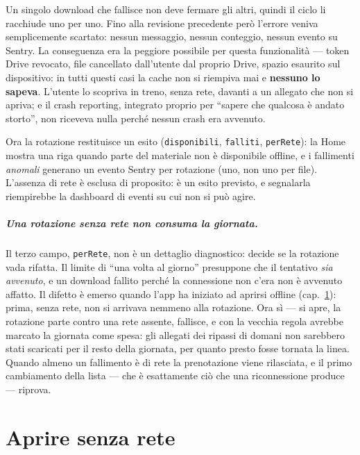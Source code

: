 \documentclass[11pt,a4paper]{report}
\begin{document}
Un singolo download che fallisce non deve fermare gli altri, quindi il ciclo
li racchiude uno per uno. Fino alla revisione precedente per\`o l'errore
veniva semplicemente scartato: nessun messaggio, nessun conteggio, nessun
evento su Sentry. La conseguenza era la peggiore possibile per questa
funzionalit\`a --- token Drive revocato, file cancellato dall'utente dal
proprio Drive, spazio esaurito sul dispositivo: in tutti questi casi la cache
non si riempiva mai e \textbf{nessuno lo sapeva}. L'utente lo scopriva in
treno, senza rete, davanti a un allegato che non si apriva; e il crash
reporting, integrato proprio per ``sapere che qualcosa \`e andato storto'',
non riceveva nulla perch\'e nessun crash era avvenuto.

Ora la rotazione restituisce un esito (\texttt{disponibili}, \texttt{falliti},
\texttt{perRete}): la Home mostra una riga quando parte del materiale non \`e
disponibile offline, e i fallimenti \emph{anomali} generano un evento Sentry
per rotazione (uno, non uno per file). L'assenza di rete \`e esclusa di
proposito: \`e un esito previsto, e segnalarla riempirebbe la dashboard di
eventi su cui non si pu\`o agire.

\paragraph{Una rotazione senza rete non consuma la giornata.} Il terzo campo,
\texttt{perRete}, non \`e un dettaglio diagnostico: decide se la rotazione vada
rifatta. Il limite di ``una volta al giorno'' presuppone che il tentativo
\emph{sia avvenuto}, e un download fallito perch\'e la connessione non c'era non
\`e avvenuto affatto. Il difetto \`e emerso quando l'app ha iniziato ad aprirsi
offline (cap.~\ref{sec:offline}): prima, senza rete, non si arrivava nemmeno
alla rotazione. Ora s\`i --- si apre, la rotazione parte contro una rete
assente, fallisce, e con la vecchia regola avrebbe marcato la giornata come
spesa: gli allegati dei ripassi di domani non sarebbero stati scaricati per il
resto della giornata, per quanto presto fosse tornata la linea. Quando almeno
un fallimento \`e di rete la prenotazione viene rilasciata, e il primo
cambiamento della lista --- che \`e esattamente ci\`o che una riconnessione
produce --- riprova.

\chapter{Aprire senza rete}
\label{sec:offline}
\end{document}
